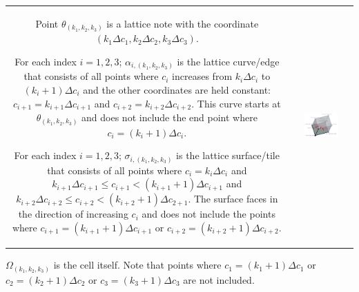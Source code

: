\documentclass{book}
\begin{document}
\vspace{1mm}

\begin{tabular}{cc}
\parbox{0.4\textwidth}{
Point \(\theta_{(k_1, k_2, k_3)}\) is a lattice note with the coordinate \((k_1 \Delta c_1, k_2 \Delta c_2, k_3 \Delta c_3)\). 

\vspace{1mm}

For each index \(i = 1, 2, 3\); \(\alpha_{i, (k_1, k_2, k_3)}\) is the lattice curve/edge that consists of all points where \(c_i\) increases from \(k_i \Delta c_i\) to \((k_i + 1)\Delta c_i\) and the other coordinates are held constant: \(c_{i+1} = k_{i+1} \Delta c_{i+1}\) and \(c_{i+2} = k_{i+2} \Delta c_{i+2}\). This curve starts at \(\theta_{(k_1, k_2, k_3)}\) and does not include the end point where \(c_i = (k_i + 1)\Delta c_i\).

\vspace{1mm}

For each index \(i = 1, 2, 3\); \(\sigma_{i, (k_1, k_2, k_3)}\) is the lattice surface/tile that consists of all points where \(c_i = k_i \Delta c_i\) and \(k_{i+1} \Delta c_{i+1} \leq c_{i+1} < (k_{i+1} + 1) \Delta c_{i+1}\) and \(k_{i+2} \Delta c_{i+2} \leq c_{i+2} < (k_{i+2} + 1) \Delta c_{2+1}\). The surface faces in the direction of increasing \(c_i\) and does not include the points where \(c_{i+1} = (k_{i+1} + 1)\Delta c_{i + 1}\) or \(c_{i+2} = (k_{i+2} + 1)\Delta c_{i + 2}\).
} & \parbox{0.6\textwidth}{
\includegraphics[width = 0.6\textwidth]{Coordinate_systems/coordinate_system_cell_2}
}
\end{tabular}

\vspace{1mm}

\(\Omega_{(k_1, k_2, k_3)}\) is the cell itself. Note that points where \(c_1 = (k_1 + 1)\Delta c_1\) or \(c_2 = (k_2 + 1)\Delta c_2\) or \(c_3 = (k_3 + 1)\Delta c_3\) are not included.
\end{document}

